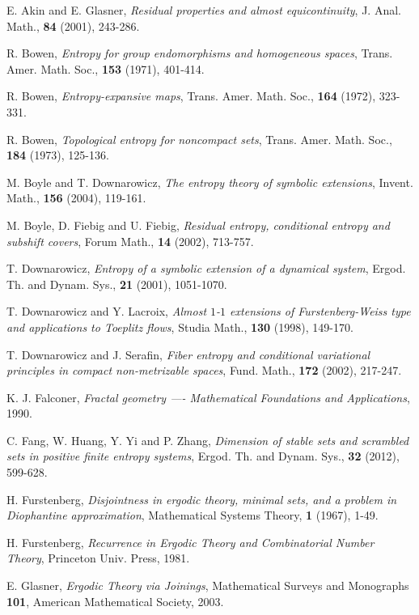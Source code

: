 \documentclass[12pt]{amsart}
\theoremstyle{definition} \theoremstyle{question}
\numberwithin{equation}{section}
\begin{document}
\begin{thebibliography}{99}

 E. Akin and E. Glasner, {\it Residual properties and almost equicontinuity},
J. Anal. Math., {\bf 84} (2001), 243-286.

R. Bowen, \emph{Entropy for group endomorphisms and
homogeneous spaces}, {Trans. Amer. Math. Soc., \bf 153} (1971),
401-414.

 R. Bowen, \emph{Entropy-expansive maps},
{Trans. Amer. Math. Soc., \bf 164} (1972), 323-331.

 R. Bowen, \emph{Topological entropy for noncompact sets},
{Trans. Amer. Math. Soc., \bf 184} (1973), 125-136.

 M. Boyle and T. Downarowicz, \emph{The entropy theory
of symbolic extensions}, {Invent. Math., \bf 156} (2004), 119-161.

 M. Boyle, D. Fiebig and U. Fiebig,
\emph{Residual entropy, conditional entropy and subshift covers},
{Forum Math., \bf 14} (2002), 713-757.

 T. Downarowicz, \emph{Entropy of a symbolic
extension of a dynamical system}, {Ergod. Th. and Dynam. Sys., \bf
21} (2001), 1051-1070.

 T. Downarowicz and Y. Lacroix, {\it Almost $1$-$1$ extensions of
Furstenberg-Weiss type and applications to Toeplitz flows}, Studia
Math., {\bf 130} (1998),  149-170.

 T. Downarowicz and J. Serafin, \emph{Fiber
entropy and conditional variational principles in compact
non-metrizable spaces}, {Fund. Math., \bf 172} (2002), 217-247.

 K. J. Falconer, \emph{Fractal geometry ---- Mathematical
Foundations and Applications}, 1990.

  C. Fang, W. Huang, Y. Yi and P. Zhang, \emph{Dimension of stable sets and
scrambled sets in positive finite entropy systems}, {Ergod. Th. and
Dynam. Sys.,} {\bf 32} (2012), 599-628.

 H. Furstenberg, \emph{Disjointness in ergodic theory,
minimal sets, and a problem in Diophantine approximation},
{Mathematical Systems Theory, \bf 1} (1967), 1-49.

 H. Furstenberg, \emph{Recurrence in Ergodic Theory and
Combinatorial Number Theory}, Princeton Univ. Press, 1981.

 E. Glasner, \emph{Ergodic Theory via Joinings},
{Mathematical Surveys and Monographs \bf 101}, American Mathematical
Society, 2003.


\end{thebibliography}
\end{document}
